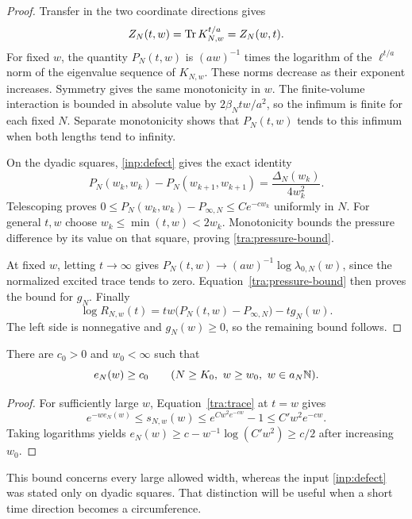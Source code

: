 \begin{proof}
Transfer in the two coordinate directions gives
\[
 Z_N(t,w)=\operatorname{Tr} K_{N,w}^{t/a}=Z_N(w,t).
\]
For fixed $w$, the quantity $P_N(t,w)$ is
$(aw)^{-1}$ times the logarithm of the $\ell^{t/a}$ norm of the
eigenvalue sequence of $K_{N,w}$.  These norms decrease as their
exponent increases.  Symmetry gives the same monotonicity in $w$.
The finite-volume interaction is bounded in absolute value by
$2\beta_Ntw/a^2$, so the infimum is finite for each fixed $N$.
Separate monotonicity shows that $P_N(t,w)$ tends to this infimum
when both lengths tend to infinity.

On the dyadic squares, \eqref{inp:defect} gives the exact identity
\[
 P_N(w_k,w_k)-P_N(w_{k+1},w_{k+1})
       =\frac{\Delta_N(w_k)}{4w_k^2}.
\]
Telescoping proves
$0\le P_N(w_k,w_k)-P_{\infty,N}\le Ce^{-cw_k}$ uniformly in $N$.
For general $t,w$ choose $w_k\le\min(t,w)<2w_k$.
Monotonicity bounds the pressure difference by its value on that
square, proving \eqref{tra:pressure-bound}.

At fixed $w$, letting $t\to\infty$ gives
$P_N(t,w)\to(aw)^{-1}\log\lambda_{0,N}(w)$, since the normalized
excited trace tends to zero.  Equation~\eqref{tra:pressure-bound}
then proves the bound for $g_N$.  Finally
\begin{equation}
 \log R_{N,w}(t)
  =tw\bigl(P_N(t,w)-P_{\infty,N}\bigr)-t g_N(w).
 \label{tra:trace-identity}
\end{equation}
The left side is nonnegative and $g_N(w)\ge0$, so the remaining
bound follows.
\end{proof}

\begin{corollary}
\label{tra:gap}
There are $c_0>0$ and $w_0<\infty$ such that
\[
 e_N(w)\ge c_0\qquad(N\ge K_0,\ w\ge w_0,\ w\in a_N\N).
\]
\end{corollary}

\begin{proof}
For sufficiently large $w$, Equation~\eqref{tra:trace} at $t=w$
gives
\[
 e^{-we_N(w)}\le s_{N,w}(w)
       \le e^{Cw^2e^{-cw}}-1\le C'w^2e^{-cw}.
\]
Taking logarithms yields
$e_N(w)\ge c-w^{-1}\log(C'w^2)\ge c/2$ after increasing $w_0$.
\end{proof}

This bound concerns every large allowed width, whereas the input
\eqref{inp:defect} was stated only on dyadic squares.  That distinction
will be useful when a short time direction becomes a circumference.

